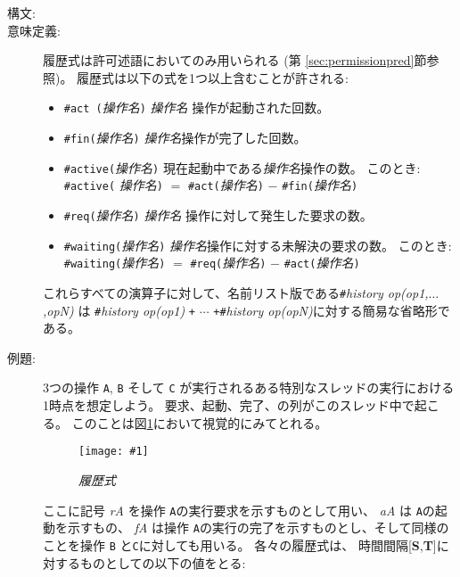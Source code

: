 \documentclass[\pformat,12pt]{jarticle}
\newcommand{\insertfig}[4]{ %
\begin{figure}[htb]
\begin{center}
\texttt{[image: \#1]} 
\end{center}
\caption{{\em #3}} #4
\end{figure}
}
\begin{document}
\begin{description}
\item[構文:] 

\item[意味定義:] 履歴式は許可述語においてのみ用いられる (第 \ref{sec:permissionpred}節参照)。
履歴式は以下の式を1つ以上含むことが許される:
  
\begin{itemize}
\item {\tt \#act (}{\em 操作名}{\tt )} {\em 操作名} 操作が起動された回数。
\item {\tt \#fin(}{\em 操作名}{\tt )} {\em 操作名}操作が完了した回数。
\item {\tt \#active(}{\em 操作名}{\tt )} 現在起動中である{\em 操作名}操作の数。 このとき:
{\tt \#active(}{\em
    操作名}{\tt )} $=$ {\tt \#act(}{\em 操作名}{\tt )}
  $-$ {\tt \#fin(}{\em 操作名}{\tt )}
\item {\tt \#req(}{\em 操作名}{\tt )}  {\em 操作名} 操作に対して発生した要求の数。
\item {\tt \#waiting(}{\em 操作名}{\tt )} {\em 操作名}操作に対する未解決の要求の数。 
このとき: {\tt
    \#waiting(}{\em 操作名}{\tt )} $=$ {\tt \#req(}{\em 操作名}{\tt )} $-$ {\tt \#act(}{\em 操作名}{\tt )}
\end{itemize}
これらすべての演算子に対して、名前リスト版である\texttt{\#}\textit{history op(op1,$\ldots$,opN)} は \texttt{\#}\textit{history op(op1)} \texttt{+} $\mathtt{\cdots}$ \texttt{+\#}\textit{history op(opN)}に対する簡易な省略形である。

\item[例題:] 
3つの操作 \texttt{A}, \texttt{B} そして \texttt{C} が実行されるある特別なスレッドの実行における1時点を想定しよう。
 要求、起動、完了、の列がこのスレッド中で起こる。
 このことは図\ref{historyfig}において視覚的にみてとれる。

\insertfig{history}{14cm}{履歴式}{\label{historyfig}}

ここに記号 \textit{rA} を操作 \texttt{A}の実行要求を示すものとして用い、 \textit{aA} は \texttt{A}の起動を示すもの、 \textit{fA} は操作 \texttt{A}の実行の完了を示すものとし、そして同様のことを操作 \texttt{B} と\texttt{C}に対しても用いる。 
各々の履歴式は、 時間間隔[\textbf{S},\textbf{T}]に対するものとしての以下の値をとる:
\end{description}
\end{document}
